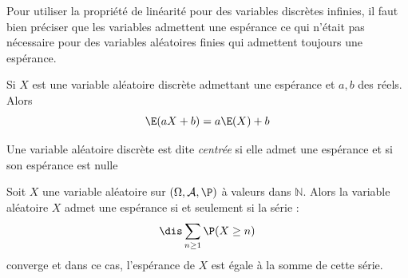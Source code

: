\documentclass[a4paper,10pt]{report}
\begin{document}
\begin{att} Pour utiliser la propriété de linéarité pour des variables discrètes infinies, il faut bien préciser que les variables admettent une espérance ce qui n'était pas nécessaire pour des variables aléatoires finies qui admettent toujours une espérance.
\end{att} 

\medskip


\begin{rems}
\item Si $X$ est une variable aléatoire discrète admettant une espérance et $a,b$ des réels. Alors 
$$ \E (aX + b) =a \E(X)+ b $$
\item Une variable aléatoire discrète est dite \textit{centrée} si elle admet une espérance et si son espérance est nulle
\end{rems}


%
%

\begin{prop} Soit $X$ une variable aléatoire sur $(\Omega, \mathcal{A}, \P)$ à valeurs dans $\mathbb{N}$. Alors la variable aléatoire $X$ admet une espérance si et seulement si la série :
$$ \dis \sum_{n \geq 1} \P(X \geq n)$$
converge et dans ce cas, l'espérance de $X$ est égale à la somme de cette série.
\end{prop}

\begin{preuve}
\vspace{10cm}
\end{preuve}
\end{document}
